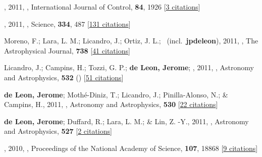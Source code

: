 \item[{\color{numcolor}\scriptsize45}] , 2011, , International Journal of Control, \textbf{84}, 1926 [\href{https://ui.adsabs.harvard.edu/abs/2011IJC....84.1926E}{3 citations}]

\item[{\color{numcolor}\scriptsize44}] , 2011, , Science, \textbf{334}, 487 [\href{https://ui.adsabs.harvard.edu/abs/2011Sci...334..487S}{131 citations}]

\item[{\color{numcolor}\scriptsize43}] Moreno, F.; Lara, L. M.; Licandro, J.; Ortiz, J. L.; \etal\ (incl.\ \textbf{jpdeleon}), 2011, , The Astrophysical Journal, \textbf{738} [\href{https://ui.adsabs.harvard.edu/abs/2011ApJ...738L..16M}{41 citations}]

\item[{\color{numcolor}\scriptsize42}] Licandro, J.; Campins, H.; Tozzi, G. P.; \textbf{de Leon, Jerome}; \etal, 2011, , Astronomy and Astrophysics, \textbf{532} () [\href{https://ui.adsabs.harvard.edu/abs/2011A&A...532A..65L}{51 citations}]

\item[{\color{numcolor}\scriptsize41}] \textbf{de Leon, Jerome}; Moth{\'e}-Diniz, T.; Licandro, J.; Pinilla-Alonso, N.; \& Campins, H., 2011, , Astronomy and Astrophysics, \textbf{530} [\href{https://ui.adsabs.harvard.edu/abs/2011A&A...530L..12D}{22 citations}]

\item[{\color{numcolor}\scriptsize40}] \textbf{de Leon, Jerome}; Duffard, R.; Lara, L. M.; \& Lin, Z. -Y., 2011, , Astronomy and Astrophysics, \textbf{527} [\href{https://ui.adsabs.harvard.edu/abs/2011A&A...527A..42D}{2 citations}]

\item[{\color{numcolor}\scriptsize39}] , 2010, , Proceedings of the National Academy of Science, \textbf{107}, 18868 [\href{https://ui.adsabs.harvard.edu/abs/2010PNAS..10718868C}{9 citations}]

